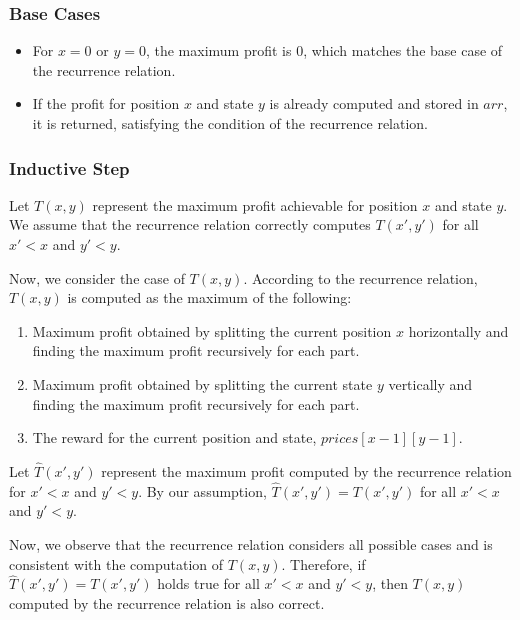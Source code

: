 \documentclass{article}
\begin{document}
\subsubsection{Base Cases}

\begin{itemize}
    \item For \( x = 0 \) or \( y = 0 \), the maximum profit is \( 0 \), which matches the base case of the recurrence relation.
    \item If the profit for position \( x \) and state \( y \) is already computed and stored in \( arr \), it is returned, satisfying the condition of the recurrence relation.
\end{itemize}

\subsubsection{Inductive Step}

Let \( T(x, y) \) represent the maximum profit achievable for position \( x \) and state \( y \). We assume that the recurrence relation correctly computes \( T(x', y') \) for all \( x' < x \) and \( y' < y \).

Now, we consider the case of \( T(x, y) \). According to the recurrence relation, \( T(x, y) \) is computed as the maximum of the following:
\begin{enumerate}
    \item Maximum profit obtained by splitting the current position \( x \) horizontally and finding the maximum profit recursively for each part.
    \item Maximum profit obtained by splitting the current state \( y \) vertically and finding the maximum profit recursively for each part.
    \item The reward for the current position and state, \( prices[x - 1][y - 1] \).
\end{enumerate}

Let \( \hat{T}(x', y') \) represent the maximum profit computed by the recurrence relation for \( x' < x \) and \( y' < y \). By our assumption, \( \hat{T}(x', y') = T(x', y') \) for all \( x' < x \) and \( y' < y \).

Now, we observe that the recurrence relation considers all possible cases and is consistent with the computation of \( T(x, y) \). Therefore, if \( \hat{T}(x', y') = T(x', y') \) holds true for all \( x' < x \) and \( y' < y \), then \( T(x, y) \) computed by the recurrence relation is also correct.
\end{document}
